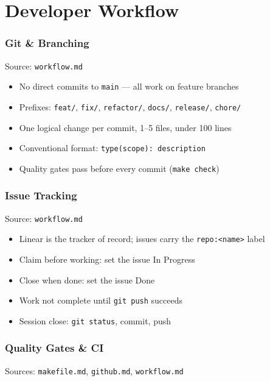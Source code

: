 \documentclass[a4paper,10pt]{article}
\begin{document}
% 
% 

\part{Developer Workflow}

\section{Git \& Branching}
\label{sec:git}
Source: \texttt{workflow.md}

\begin{itemize}
  \item No direct commits to \texttt{main} --- all work on feature branches
  \item Prefixes: \texttt{feat/}, \texttt{fix/}, \texttt{refactor/}, \texttt{docs/}, \texttt{release/}, \texttt{chore/}
  \item One logical change per commit, 1--5 files, under 100 lines
  \item Conventional format: \texttt{type(scope): description}
  \item Quality gates pass before every commit (\texttt{make check})
\end{itemize}

\section{Issue Tracking}
\label{sec:tracking}
Source: \texttt{workflow.md}

\begin{itemize}
  \item Linear is the tracker of record; issues carry the \texttt{repo:<name>} label
  \item Claim before working: set the issue In Progress
  \item Close when done: set the issue Done
  \item Work not complete until \texttt{git push} succeeds
  \item Session close: \texttt{git status}, commit, push
\end{itemize}

\section{Quality Gates \& CI}
\label{sec:ci}
Sources: \texttt{makefile.md}, \texttt{github.md}, \texttt{workflow.md}
\end{document}
